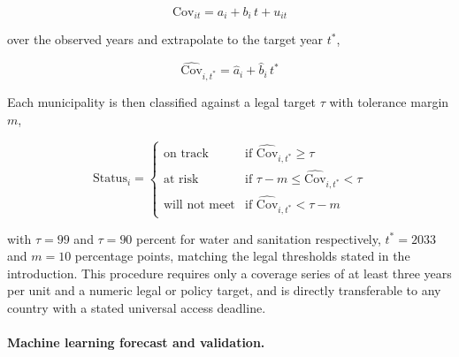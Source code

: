 \documentclass[pdflatex,sn-mathphys-num]{sn-jnl}%
\theoremstyle{thmstyleone}%
\theoremstyle{thmstyletwo}%
\theoremstyle{thmstylethree}%
\begin{document}
\begin{equation}
\text{Cov}_{it} = a_i + b_i \, t + u_{it}
\label{eq_trend}
\end{equation}

over the observed years and extrapolate to the target year $t^{*}$,

\begin{equation}
\widehat{\text{Cov}}_{i,t^{*}} = \hat{a}_i + \hat{b}_i \, t^{*}
\label{eq_extrapolation}
\end{equation}

Each municipality is then classified against a legal target $\tau$ with tolerance margin $m$,

\begin{equation}
\text{Status}_i =
\begin{cases}
\text{on track} & \text{if } \widehat{\text{Cov}}_{i,t^{*}} \geq \tau \\
\text{at risk} & \text{if } \tau - m \leq \widehat{\text{Cov}}_{i,t^{*}} < \tau \\
\text{will not meet} & \text{if } \widehat{\text{Cov}}_{i,t^{*}} < \tau - m
\end{cases}
\label{eq_classification}
\end{equation}

with $\tau = 99$ and $\tau = 90$ percent for water and sanitation respectively, $t^{*} = 2033$ and $m = 10$ percentage points, matching the legal thresholds stated in the introduction. This procedure requires only a coverage series of at least three years per unit and a numeric legal or policy target, and is directly transferable to any country with a stated universal access deadline.

\paragraph{Machine learning forecast and validation.}
\end{document}
